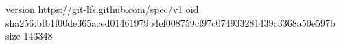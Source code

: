 version https://git-lfs.github.com/spec/v1
oid sha256:bfb1f00de365aced01461979b4ef008759cf97c074933281439c3368a50e597b
size 143348

